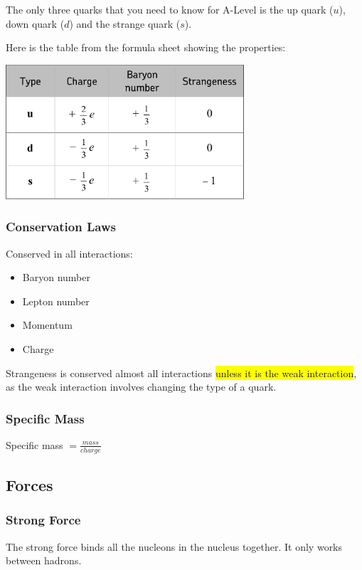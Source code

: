 \documentclass[a4paper, 12pt]{article}
\begin{document}
The only three quarks that you need to know for A-Level is the up quark ($u$), down quark ($d$) and the strange quark ($s$).

Here is the table from the formula sheet showing the properties:

\begin{center}
\includegraphics[height=5cm]{images/quarks.png}
\end{center}

\subsubsection{Conservation Laws}

Conserved in all interactions:
\begin{itemize}
	\item{Baryon number}
	\item{Lepton number}
	\item{Momentum}
	\item{Charge}
\end{itemize}

Strangeness is conserved almost all interactions \colorbox{yellow}{unless it is the weak interaction}, as the weak interaction involves changing the type of a quark.

\subsubsection{Specific Mass}

Specific mass $= \frac{mass}{charge}$

\subsection{Forces}

\subsubsection{Strong Force}

The strong force binds all the nucleons in the nucleus together. It only works between hadrons.
\end{document}
